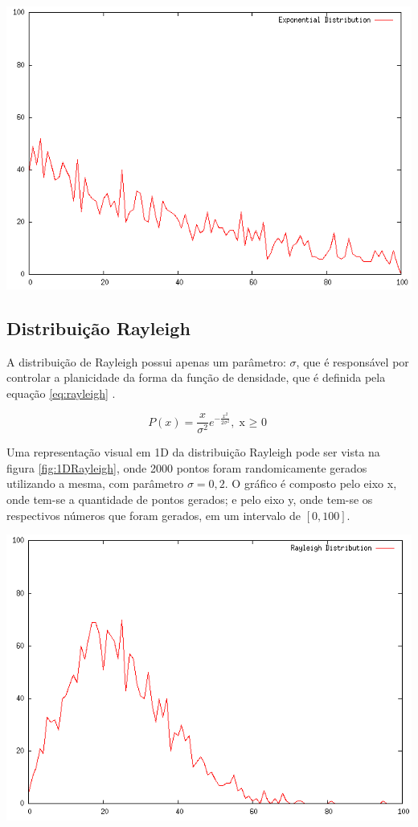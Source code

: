 {
    \centering
    \includegraphics[width=0.5\linewidth]{figuras/DistribuicaoExponencial.png}
    \label{fig:1DExponencial}
}

\subsection{Distribuição Rayleigh}

A distribuição de Rayleigh possui apenas um parâmetro: $\sigma$, que é responsável por controlar a planicidade da forma da função de densidade, que é definida pela equação \ref{eq:rayleigh} \cite{yu}.

\begin{equation}
\label{eq:rayleigh}
P(x) = \frac{x}{\sigma^{2}}e^{-\frac{x^{2}}{2\sigma^{2}}},  \text{x $\geq$ 0}
\end{equation}

Uma representação visual em 1D da distribuição Rayleigh pode ser vista na figura \ref{fig:1DRayleigh}, onde 2000 pontos foram randomicamente gerados utilizando a mesma, com parâmetro $\sigma = 0,2$. O gráfico é composto pelo eixo x, onde tem-se a quantidade de pontos gerados; e pelo eixo y, onde tem-se os respectivos números que foram gerados, em um intervalo de $[0, 100]$.

{
    \centering
    \includegraphics[width=0.5\linewidth]{figuras/DistribuicaoRayleigh.png}
    \label{fig:1DRayleigh}
}

